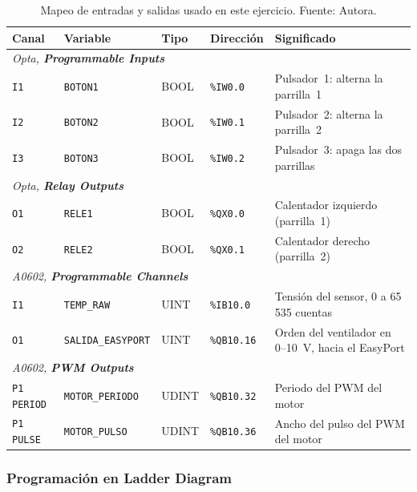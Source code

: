 \documentclass[12pt,a4paper]{article}
\newcommand{\ui}[1]{\textcolor{DeepBlue}{\textsf{\textbf{#1}}}}
\begin{document}
\begin{table}[H]
\centering
\caption{Mapeo de entradas y salidas usado en este ejercicio. Fuente: Autora.}
\label{tab:p2_mapeo}
\linespread{1}\small\selectfont
\renewcommand{\arraystretch}{1.2}
\begin{tabularx}{\linewidth}{l l l l X}
\toprule
\textbf{Canal} & \textbf{Variable} & \textbf{Tipo} & \textbf{Dirección} & \textbf{Significado} \\
\midrule
\multicolumn{5}{l}{\textit{Opta, \ui{Programmable Inputs}}} \\
\midrule
\texttt{I1} & \texttt{BOTON1} & BOOL & \texttt{\%IW0.0} & Pulsador~1: alterna la parrilla~1 \\
\texttt{I2} & \texttt{BOTON2} & BOOL & \texttt{\%IW0.1} & Pulsador~2: alterna la parrilla~2 \\
\texttt{I3} & \texttt{BOTON3} & BOOL & \texttt{\%IW0.2} & Pulsador~3: apaga las dos parrillas \\
\midrule
\multicolumn{5}{l}{\textit{Opta, \ui{Relay Outputs}}} \\
\midrule
\texttt{O1} & \texttt{RELE1} & BOOL & \texttt{\%QX0.0} & Calentador izquierdo (parrilla~1) \\
\texttt{O2} & \texttt{RELE2} & BOOL & \texttt{\%QX0.1} & Calentador derecho (parrilla~2) \\
\midrule
\multicolumn{5}{l}{\textit{A0602, \ui{Programmable Channels}}} \\
\midrule
\texttt{I1} & \texttt{TEMP\_RAW} & UINT & \texttt{\%IB10.0} & Tensión del sensor, 0 a 65\,535 cuentas \\
\texttt{O1} & \texttt{SALIDA\_EASYPORT} & UINT & \texttt{\%QB10.16} & Orden del ventilador en 0--10~V, hacia el EasyPort \\
\midrule
\multicolumn{5}{l}{\textit{A0602, \ui{PWM Outputs}}} \\
\midrule
\texttt{P1 PERIOD} & \texttt{MOTOR\_PERIODO} & UDINT & \texttt{\%QB10.32} & Periodo del PWM del motor \\
\texttt{P1 PULSE}  & \texttt{MOTOR\_PULSO}   & UDINT & \texttt{\%QB10.36} & Ancho del pulso del PWM del motor \\
\bottomrule
\end{tabularx}
\end{table}

\subsubsection{Programación en Ladder Diagram}
\label{subsubsec:p2_ladder}
\end{document}
